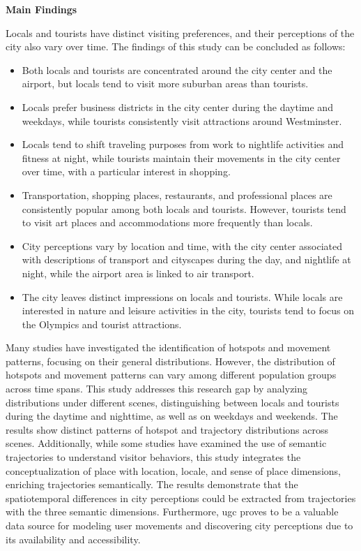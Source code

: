\documentclass{article}
\theoremstyle{remark}
\begin{document}
\textbf{Main Findings}

Locals and tourists have distinct visiting preferences, and their perceptions of the city also vary over time. The findings of this study can be concluded as follows:
\begin{itemize}
    \item Both locals and tourists are concentrated around the city center and the airport, but locals tend to visit more suburban areas than tourists.
    \item Locals prefer business districts in the city center during the daytime and weekdays, while tourists consistently visit attractions around Westminster.
    \item Locals tend to shift traveling purposes from work to nightlife activities and fitness at night, while tourists maintain their movements in the city center over time, with a particular interest in shopping.
    \item Transportation, shopping places, restaurants, and professional places are consistently popular among both locals and tourists. However, tourists tend to visit art places and accommodations more frequently than locals.
    \item City perceptions vary by location and time, with the city center associated with descriptions of transport and cityscapes during the day, and nightlife at night, while the airport area is linked to air transport.
    \item The city leaves distinct impressions on locals and tourists. While locals are interested in nature and leisure activities in the city, tourists tend to focus on the Olympics and tourist attractions.
\end{itemize}


Many studies have investigated the identification of hotspots and movement patterns, focusing on their general distributions. However, the distribution of hotspots and movement patterns can vary among different population groups across time spans. This study addresses this research gap by analyzing distributions under different scenes, distinguishing between locals and tourists during the daytime and nighttime, as well as on weekdays and weekends. The results show distinct patterns of hotspot and trajectory distributions across scenes. Additionally, while some studies have examined the use of semantic trajectories to understand visitor behaviors, this study integrates the conceptualization of place with location, locale, and sense of place dimensions, enriching trajectories semantically. The results demonstrate that the spatiotemporal differences in city perceptions could be extracted from trajectories with the three semantic dimensions. Furthermore, \acrshort{ugc} proves to be a valuable data source for modeling user movements and discovering city perceptions due to its availability and accessibility.
\end{document}
